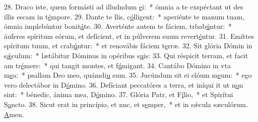28. Draco iste, quem formásti ad illudndum \uline{e}i:~* ómnia a te exspéctant ut des illis escam in t\uline{é}mpore.
29. Dante te llis, c\uline{ó}lligent:~* aperiénte te manum tuam, ómnia implebúntur bonit\uline{á}te.
30. Averténte autem te fáciem, trbab\uline{ú}ntur:~* áuferes spíritum eórum, et defícient, et in púlverem suum revert\uline{é}ntur.
31. Emíttes spíritum tuum, et crab\uline{ú}ntur:~* et renovábis fáciem t\uline{e}rræ.
32. Sit glória Dómin in s\uline{ǽ}culum:~* lætábitur Dóminus in opéribus s\uline{u}is:
33. Qui réspicit terram, et facit am tr\uline{é}mere:~* qui tangit montes, et f\uline{ú}migant.
34. Cantábo Dómino in vta m\uline{e}a:~* psallam Deo meo, quámdi\uline{u} sum.
35. Jucúndum sit ei elóum m\uline{e}um:~* ego vero delectábor in D\uline{ó}mino.
36. Defíciant peccatóres a terra, et iníqui it ut n\uline{o}n sint:~* bénedic, ánima mea, D\uline{ó}mino.
37. Glória Patr, et F\uline{í}lio,~* et Spirítui S\uline{a}ncto.
38. Sicut erat in princípio, et nnc, et s\uline{e}mper,~* et in sǽcula sæculórum. \uline{A}men.
